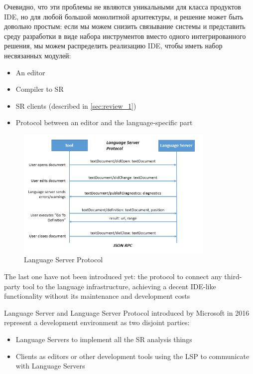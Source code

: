 Очевидно, что эти проблемы не являются уникальными для класса продуктов IDE, но для любой большой монолитной архитектуры, 
и решение может быть довольно простым: если мы можем снизить связывание системы и представить среду разработки в виде набора инструментов 
вместо одного интегрированного решения, мы можем распределить реализацию IDE, чтобы иметь набор несвязанных модулей:
\begin{itemize}
    \item An editor
    \item Compiler to SR
    \item SR clients (described in \ref{sec:review_1})
    \item Protocol between an editor and the language-specific part
\end{itemize}
\newpage

\begin{figure}[H]
    \centering
    \includegraphics[width=0.85\textwidth]{figs/lsp.png}
    \caption{Language Server Protocol}
\end{figure}

The last one have not been introduced yet: the protocol to connect any
third-party tool to the language infrastructure, achieving a decent IDE-like
functionality without its maintenance and development costs

Language Server and Language Server Protocol introduced by Microsoft in 2016
represent a development environment as two disjoint parties:
\begin{itemize}
    \item Language Servers to implement all the SR analysis things
    \item Clients as editors or other development tools using the LSP to communicate with Language Servers \cite{Sourcegraph}
\end{itemize}


